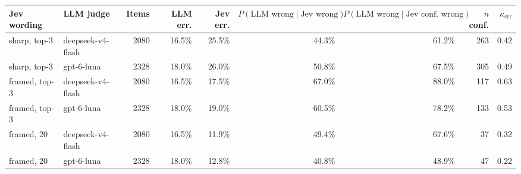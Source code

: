 \begin{tabular}{@{}llrrrrrrr@{}}
\toprule
Jev wording & LLM judge & Items & LLM err. & Jev err. & $P(\text{LLM wrong}\mid\text{Jev wrong})$ & $P(\text{LLM wrong}\mid\text{Jev conf.\ wrong})$ & $n$ conf. & $\kappa_{\text{err}}$ \\
\midrule
sharp, top-3 & deepseek-v4-flash & 2080 & 16.5\% & 25.5\% & 44.3\% & 61.2\% & 263 & 0.42 \\
sharp, top-3 & gpt-6-luna & 2328 & 18.0\% & 26.0\% & 50.8\% & 67.5\% & 305 & 0.49 \\
framed, top-3 & deepseek-v4-flash & 2080 & 16.5\% & 17.5\% & 67.0\% & 88.0\% & 117 & 0.63 \\
framed, top-3 & gpt-6-luna & 2328 & 18.0\% & 19.0\% & 60.5\% & 78.2\% & 133 & 0.53 \\
framed, 20 & deepseek-v4-flash & 2080 & 16.5\% & 11.9\% & 49.4\% & 67.6\% & 37 & 0.32 \\
framed, 20 & gpt-6-luna & 2328 & 18.0\% & 12.8\% & 40.8\% & 48.9\% & 47 & 0.22 \\
\bottomrule
\end{tabular}
